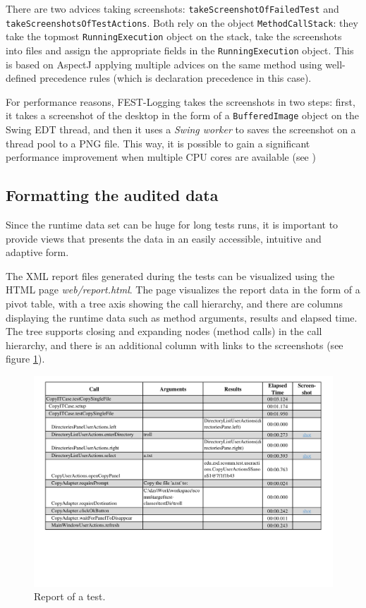 There are two advices taking screenshots: \texttt{take\-Screen\-shot\-Of\-Failed\-Test} and \texttt{take\-Screen\-shots\-Of\-Test\-Actions}. Both rely on the object \texttt{MethodCallStack}: they take the topmost \texttt{Running\-Execution} object on the stack, take the screenshots into files and assign the appropriate fields in the \texttt{Running\-Execution} object. This is based on AspectJ applying multiple advices on the same method using well-defined precedence rules (which is declaration precedence in this case).

For performance reasons, FEST-Logging takes the screenshots in two steps: first, it takes a screenshot of the desktop in the form of a \texttt{BufferedImage} object on the Swing EDT thread, and then it uses a \emph{Swing worker} to saves the screenshot on a thread pool to a PNG file. This way, it is possible to gain a significant performance improvement when multiple CPU cores are available (see )

\subsection {Formatting the audited data}

Since the runtime data set can be huge for long tests runs, it is important to provide views that presents the data in an easily accessible, intuitive and adaptive form. 

The XML report files generated during the tests can be visualized using the HTML page \emph{web/report.html}. The page visualizes the report data in the form of a pivot table, with a tree axis showing the call hierarchy, and there are columns displaying the runtime data such as method arguments, results and elapsed time. The tree supports closing and expanding nodes (method calls) in the call hierarchy, and there is an additional column with links to the screenshots (see figure \ref{fig:fest-logging_test-report}).

\begin{figure}[h!]
\centering
  \includegraphics[width=1\textwidth]{images/fest-logging-test-report.pdf}
\caption{Report of a test.}
\label{fig:fest-logging_test-report}
\end{figure}


